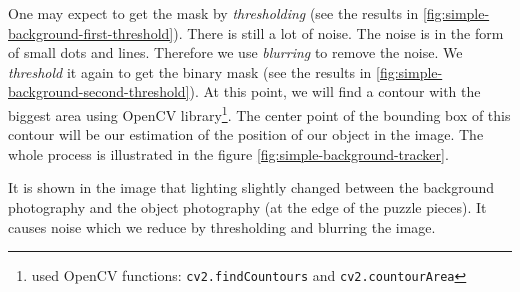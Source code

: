 One may expect to get the mask by \emph{thresholding} (see the results in
\ref{fig:simple-background-first-threshold}). There is still a lot of noise.
The noise is in the form of small dots and lines. Therefore we use
\emph{blurring} to remove the noise. We \emph{threshold} it again to get the
binary mask (see the results in \ref{fig:simple-background-second-threshold}).
At this point, we will find a contour with the biggest area using OpenCV
library\footnote{used OpenCV functions: \verb+cv2.findCountours+ and
\verb+cv2.countourArea+}. The center point of the bounding box of this contour
will be our estimation of the position of our object in the image. The whole
process is illustrated in the figure \ref{fig:simple-background-tracker}.

It is shown in the image that lighting slightly changed between the background
photography and the object photography (at the edge of the puzzle pieces). It
causes noise which we reduce by thresholding and blurring the image.

